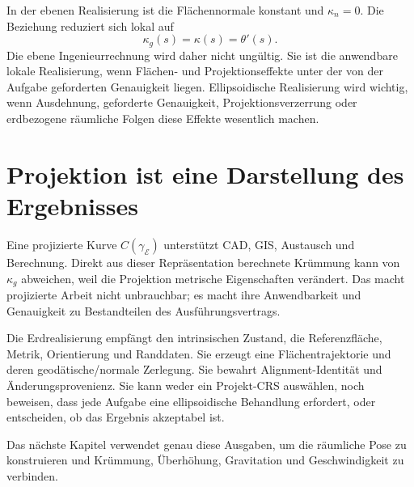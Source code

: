 In der ebenen Realisierung ist die Flächennormale konstant und
\(\kappa_n=0\). Die Beziehung reduziert sich lokal auf
\[
\kappa_g(s)=\kappa(s)=\theta'(s).
\]
Die ebene Ingenieurrechnung wird daher nicht ungültig. Sie ist die anwendbare
lokale Realisierung, wenn Flächen- und Projektionseffekte unter der von der
Aufgabe geforderten Genauigkeit liegen. Ellipsoidische Realisierung wird
wichtig, wenn Ausdehnung, geforderte Genauigkeit, Projektionsverzerrung oder
erdbezogene räumliche Folgen diese Effekte wesentlich machen.

\section{Projektion ist eine Darstellung des Ergebnisses}

Eine projizierte Kurve \(C(\gamma_{\mathcal E})\) unterstützt CAD, GIS,
Austausch und Berechnung. Direkt aus dieser Repräsentation berechnete
Krümmung kann von \(\kappa_g\) abweichen, weil die Projektion metrische
Eigenschaften verändert. Das macht projizierte Arbeit nicht unbrauchbar; es
macht ihre Anwendbarkeit und Genauigkeit zu Bestandteilen des
Ausführungsvertrags.

Die Erdrealisierung empfängt den intrinsischen Zustand, die Referenzfläche,
Metrik, Orientierung und Randdaten. Sie erzeugt eine Flächentrajektorie und
deren geodätische/normale Zerlegung. Sie bewahrt Alignment-Identität und
Änderungsprovenienz. Sie kann weder ein Projekt-CRS auswählen, noch beweisen,
dass jede Aufgabe eine ellipsoidische Behandlung erfordert, oder entscheiden,
ob das Ergebnis akzeptabel ist.

Das nächste Kapitel verwendet genau diese Ausgaben, um die räumliche Pose zu
konstruieren und Krümmung, Überhöhung, Gravitation und Geschwindigkeit zu
verbinden.
